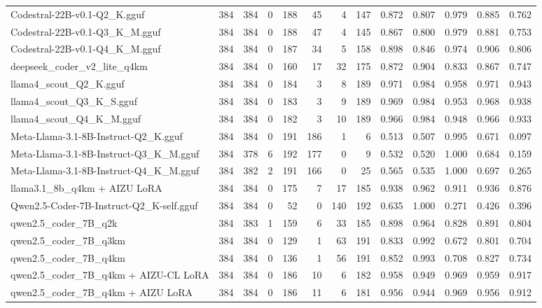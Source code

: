 \begin{table}[htbp]
{\begin{tabular}{lrrrrrrrrrrrr}
    Codestral-22B-v0.1-Q2\_K.gguf & 384 & 384 & 0 & 188 & 45 & 4 & 147 & 0.872 & 0.807 & 0.979 & 0.885 & 0.762 \\
    Codestral-22B-v0.1-Q3\_K\_M.gguf & 384 & 384 & 0 & 188 & 47 & 4 & 145 & 0.867 & 0.800 & 0.979 & 0.881 & 0.753 \\
    Codestral-22B-v0.1-Q4\_K\_M.gguf & 384 & 384 & 0 & 187 & 34 & 5 & 158 & 0.898 & 0.846 & 0.974 & 0.906 & 0.806 \\
    deepseek\_coder\_v2\_lite\_q4km & 384 & 384 & 0 & 160 & 17 & 32 & 175 & 0.872 & 0.904 & 0.833 & 0.867 & 0.747 \\
    llama4\_scout\_Q2\_K.gguf & 384 & 384 & 0 & 184 & 3 & 8 & 189 & 0.971 & 0.984 & 0.958 & 0.971 & \cellcolor{green!20}0.943 \\
    llama4\_scout\_Q3\_K\_S.gguf & 384 & 384 & 0 & 183 & 3 & 9 & 189 & 0.969 & 0.984 & 0.953 & 0.968 & 0.938 \\
    llama4\_scout\_Q4\_K\_M.gguf & 384 & 384 & 0 & 182 & 3 & 10 & 189 & 0.966 & 0.984 & 0.948 & 0.966 & 0.933 \\
    Meta-Llama-3.1-8B-Instruct-Q2\_K.gguf & 384 & 384 & 0 & 191 & 186 & 1 & 6 & 0.513 & 0.507 & 0.995 & 0.671 & 0.097 \\
    Meta-Llama-3.1-8B-Instruct-Q3\_K\_M.gguf & 384 & 378 & 6 & 192 & 177 & 0 & 9 & 0.532 & 0.520 & 1.000 & 0.684 & 0.159 \\
    Meta-Llama-3.1-8B-Instruct-Q4\_K\_M.gguf & 384 & 382 & 2 & 191 & 166 & 0 & 25 & 0.565 & 0.535 & 1.000 & 0.697 & 0.265 \\
    llama3.1\_8b\_q4km + AIZU LoRA & 384 & 384 & 0 & 175 & 7 & 17 & 185 & 0.938 & 0.962 & 0.911 & 0.936 & 0.876 \\
    Qwen2.5-Coder-7B-Instruct-Q2\_K-self.gguf & 384 & 384 & 0 & 52 & 0 & 140 & 192 & 0.635 & 1.000 & 0.271 & 0.426 & 0.396 \\
    qwen2.5\_coder\_7B\_q2k & 384 & 383 & 1 & 159 & 6 & 33 & 185 & 0.898 & 0.964 & 0.828 & 0.891 & 0.804 \\
    qwen2.5\_coder\_7B\_q3km & 384 & 384 & 0 & 129 & 1 & 63 & 191 & 0.833 & 0.992 & 0.672 & 0.801 & 0.704 \\
    qwen2.5\_coder\_7B\_q4km & 384 & 384 & 0 & 136 & 1 & 56 & 191 & 0.852 & 0.993 & 0.708 & 0.827 & 0.734 \\
    qwen2.5\_coder\_7B\_q4km + AIZU-CL LoRA & 384 & 384 & 0 & 186 & 10 & 6 & 182 & 0.958 & 0.949 & 0.969 & 0.959 & 0.917 \\
    qwen2.5\_coder\_7B\_q4km + AIZU LoRA & 384 & 384 & 0 & 186 & 11 & 6 & 181 & 0.956 & 0.944 & 0.969 & 0.956 & 0.912 \\

\end{tabular}}
\end{table}
